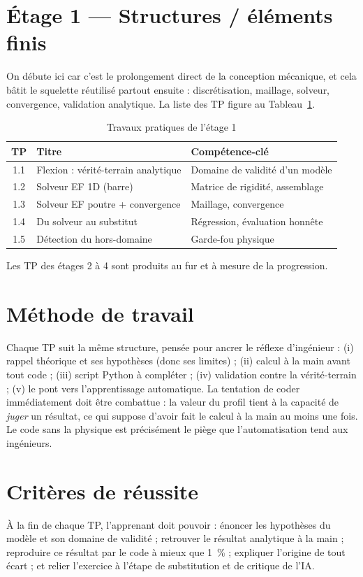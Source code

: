 \documentclass[10pt,journal]{IEEEtran}
\begin{document}
\section{Étage 1 --- Structures / éléments finis}
On débute ici car c'est le prolongement direct de la conception mécanique, et cela bâtit le squelette réutilisé partout ensuite : discrétisation, maillage, solveur, convergence, validation analytique. La liste des TP figure au Tableau~\ref{tab:tp1}.

\begin{table}[!t]
\caption{Travaux pratiques de l'étage 1}
\label{tab:tp1}
\centering
\begin{tabular}{@{}cll@{}}
\toprule
TP & Titre & Compétence-clé \\
\midrule
1.1 & Flexion : vérité-terrain analytique & Domaine de validité d'un modèle \\
1.2 & Solveur EF 1D (barre) & Matrice de rigidité, assemblage \\
1.3 & Solveur EF poutre + convergence & Maillage, convergence \\
1.4 & Du solveur au substitut & Régression, évaluation honnête \\
1.5 & Détection du hors-domaine & Garde-fou physique \\
\bottomrule
\end{tabular}
\end{table}

Les TP des étages 2 à 4 sont produits au fur et à mesure de la progression.

\section{Méthode de travail}
Chaque TP suit la même structure, pensée pour ancrer le réflexe d'ingénieur : (i) rappel théorique et ses hypothèses (donc ses limites) ; (ii) calcul à la main avant tout code ; (iii) script Python à compléter ; (iv) validation contre la vérité-terrain ; (v) le pont vers l'apprentissage automatique. La tentation de coder immédiatement doit être combattue : la valeur du profil tient à la capacité de \emph{juger} un résultat, ce qui suppose d'avoir fait le calcul à la main au moins une fois. Le code sans la physique est précisément le piège que l'automatisation tend aux ingénieurs.

\section{Critères de réussite}
À la fin de chaque TP, l'apprenant doit pouvoir : énoncer les hypothèses du modèle et son domaine de validité ; retrouver le résultat analytique à la main ; reproduire ce résultat par le code à mieux que 1~\% ; expliquer l'origine de tout écart ; et relier l'exercice à l'étape de substitution et de critique de l'IA.
\end{document}

